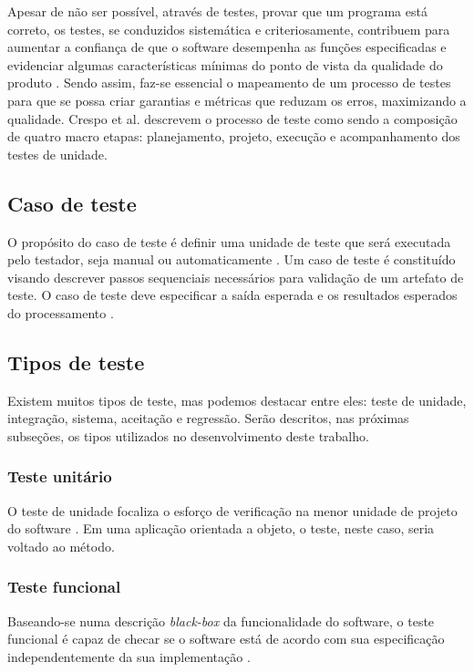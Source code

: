 \documentclass[tg]{mdtufsm}
\begin{document}
Apesar de não ser possível, através de testes, provar que um programa está correto, os testes, se conduzidos sistemática e criteriosamente, contribuem para
aumentar a confiança de que o software desempenha as funções especificadas e evidenciar algumas características mínimas do ponto de vista da qualidade do produto \cite{maldonado2004introduccao}. Sendo assim,
faz-se essencial o mapeamento de um processo de testes para que se possa criar garantias e métricas que reduzam os erros, maximizando a qualidade. Crespo et al. \citeyearpar{crespo2004metodologia} descrevem o processo de
teste como sendo a composição de quatro macro etapas: planejamento, projeto, execução e acompanhamento dos testes de unidade.

\subsection{Caso de teste}
O propósito do caso de teste é definir uma unidade de teste que será executada pelo testador, seja manual ou automaticamente \cite{rios2006teste}. Um caso de teste é constituído visando descrever passos sequenciais necessários para validação de um artefato de teste. O caso de teste deve especificar a saída esperada e os resultados esperados do processamento \cite{myers2011art}.

\subsection{Tipos de teste}
Existem muitos tipos de teste, mas podemos destacar entre eles: teste de unidade, integração, sistema, aceitação e regressão. Serão descritos, nas próximas subseções, os tipos utilizados no desenvolvimento deste trabalho.

\subsubsection{Teste unitário}
O teste de unidade focaliza o esforço de verificação na menor unidade de projeto do software \cite{pressman2011engenharia}. Em uma aplicação orientada a objeto, o teste, neste caso, seria voltado ao método.

\subsubsection{Teste funcional}
Baseando-se numa descrição \emph{black-box} da funcionalidade do software, o teste funcional é capaz de checar se o software está de acordo com sua especificação independentemente da sua implementação \cite{fantinato2005autotest}.
 
\end{document}
